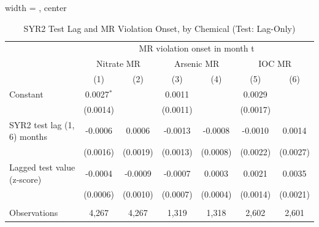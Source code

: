 
\begin{table}[htbp]
   
   \caption{\label{tab:syr2_test_mr_violation_bychem_lagonly_test} SYR2 Test Lag and MR Violation Onset, by Chemical (Test: Lag-Only)}
   \bigskip
   
   \centering
   
   \begin{adjustbox}{width = \textwidth, center}
      
      
      \begin{tabular}{lcccccc}
         \toprule
         
          & \multicolumn{6}{c}{MR violation onset in month t}\\
         
          & \multicolumn{2}{c}{Nitrate MR} & \multicolumn{2}{c}{Arsenic MR} & \multicolumn{2}{c}{IOC MR} \\ 
         
                                                & (1)          & (2)           & (3)      & (4)           & (5)      & (6)\\  
         
         \midrule 
         Constant                               & 0.0027$^{*}$ &               & 0.0011   &               & 0.0029   &   \\   
                                                & (0.0014)     &               & (0.0011) &               & (0.0017) &   \\   
         SYR2 test lag (1, 6) months            & -0.0006      & 0.0006        & -0.0013  & -0.0008       & -0.0010  & 0.0014\\   
                                                & (0.0016)     & (0.0019)      & (0.0013) & (0.0008)      & (0.0022) & (0.0027)\\   
         Lagged test value (z-score)            & -0.0004      & -0.0009       & -0.0007  & 0.0003        & 0.0021   & 0.0035\\   
                                                & (0.0006)     & (0.0010)      & (0.0007) & (0.0004)      & (0.0014) & (0.0021)\\   
         
          \\
         
         Observations                           & 4,267        & 4,267         & 1,319    & 1,318         & 2,602    & 2,601\\  
         

\end{tabular}
\end{adjustbox}
\end{table}
